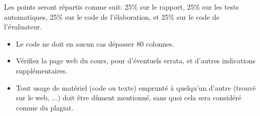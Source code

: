 \documentclass{article}
\renewcommand \: {\!:\!}
\begin{document}
Les points seront répartis comme suit: 25\% sur le rapport, 25\% sur les
tests automatiques, 25\% sur le code de l'élaboration, et 25\% sur le
code de l'évaluateur.

\begin{itemize}
\item Le code ne doit en aucun cas dépasser 80 colonnes.
\item Vérifiez la page web du cours, pour d'éventuels errata, et d'autres
  indications supplémentaires.
\item Tout usage de matériel (code ou texte) emprunté à quelqu'un d'autre
  (trouvé sur le web, ...) doit être dûment mentionné, sans quoi cela sera
  considéré comme du plagiat.
\end{itemize}
\end{document}
